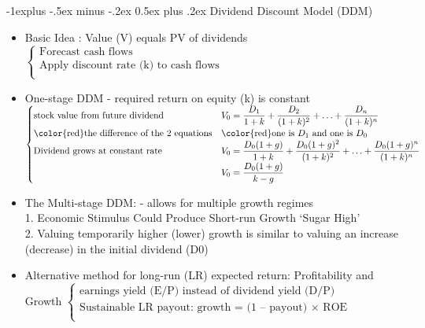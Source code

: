 \documentclass[10pt,landscape]{article}
\makeatletter
\renewcommand{\subsection}{\@startsection{subsection}{2}{0mm}%
                                {-1explus -.5ex minus -.2ex}%
                                {0.5ex plus .2ex}%
                                {\normalfont\normalsize\bfseries}}
\makeatother
\begin{document}
\begin{multicols}{2}
    \subsection{Dividend Discount Model (DDM)}
    \begin{itemize}
        \item Basic Idea : Value (V) equals PV of dividends\\
        	$
            \begin{cases}
                \text{Forecast cash flows}\\
                \text{Apply discount rate (k) to cash flows}\\
            \end{cases}
            $
        \item One-stage DDM - required return on equity (k) is constant\\
        	$
            \begin{cases}
                \text{stock value from future dividend}& \displaystyle V_0=\frac{D_1}{1+k}+\frac{D_2}{(1+k)^2}+\ldots+\frac{D_n}{(1+k)^n}\\
                \text{\color{red}the difference of the 2 equations}& \text{\color{red}one is $D_1$ and one is $D_0$}\\
                \text{Dividend grows at constant rate}& \displaystyle V_0=\frac{D_0(1+g)}{1+k}+\frac{D_0(1+g)^2}{(1+k)^2}+\ldots+\frac{D_0(1+g)^n}{(1+k)^n}\\
                \text{} & \displaystyle V_0=\frac{D_0(1+g)}{k-g}\\
            \end{cases}
            $
        \item The Multi-stage DDM: - allows for multiple growth regimes\\
        	1. Economic Stimulus Could Produce Short-run Growth ‘Sugar High’\\
        	2. Valuing temporarily higher (lower) growth is similar to valuing an increase (decrease) in the initial dividend (D0)
        \item Alternative method for long-run (LR) expected return: Profitability and Growth 
        	$
            \begin{cases}
                \text{earnings yield (E/P) instead of dividend yield (D/P)}\\
                \text{Sustainable LR payout: growth = (1 – payout) $\times$ ROE }\\
            \end{cases}
            $
    \end{itemize}



\end{multicols}
\end{document}
